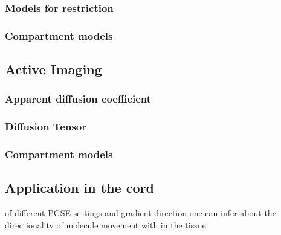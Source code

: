 \subsubsection{Models for restriction}
\subsubsection{Compartment models}

\subsection*{Active Imaging}
\subsubsection{Apparent diffusion coefficient}
\subsubsection{Diffusion Tensor}
\subsubsection{Compartment models}

\subsection*{Application in the cord}

 of different \gls{PGSE} settings and gradient direction one can infer about the directionality of molecule movement with in the tissue. 


